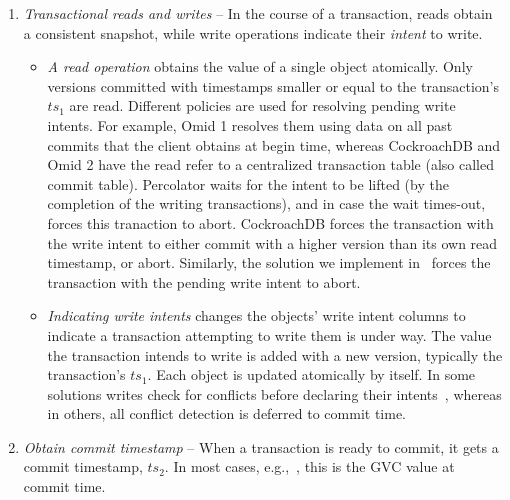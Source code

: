 \begin{enumerate}
  \item \emph{Transactional reads and writes} -- 
 In the course of a transaction, reads  obtain a consistent snapshot,
 while write operations indicate their \emph{intent} to write. 
  	 	\begin{itemize}
  		\item  \emph{A read operation} obtains the value of a single object atomically. 
  		Only versions committed with timestamps  smaller or equal to the transaction's $ts_1$ are read. 
 		Different  policies are used for resolving pending write intents. For example, Omid 1 resolves them 
 		using data on all past commits that the client obtains at begin time, whereas CockroachDB and Omid 2 
 		have the read refer to a centralized transaction table (also called commit table). 
		Percolator  waits for the intent to be lifted (by the completion of the writing transactions), and in case the wait times-out, 
		forces this tranaction to abort. 
	 	 CockroachDB forces the transaction with the write intent to either commit with a higher version 
  		than its own read timestamp, or abort. Similarly, the solution we implement in \sys\ forces the transaction with the pending write 
  		intent to abort. 
  		\item \emph{Indicating write intents} changes the objects' write intent columns
  		to indicate a transaction attempting to write them is under way. The value the
  		transaction intends to write is added with a new version, typically the transaction's $ts_1$.
		Each object is updated atomically by itself. 
		In some solutions writes check for conflicts before declaring their intents~\cite{cockroach}, whereas in others, 
		all conflict detection is deferred to commit time. 
  	\end{itemize}
  \item \emph{Obtain commit timestamp} --
  When a transaction is ready to commit, it gets a commit timestamp, $ts_2$. 
  In most cases, e.g.,~\cite{Percolator2010,tephra,OmidICDE2014,omid-blog}, 
  this is the GVC value at commit time. 

\end{enumerate}
